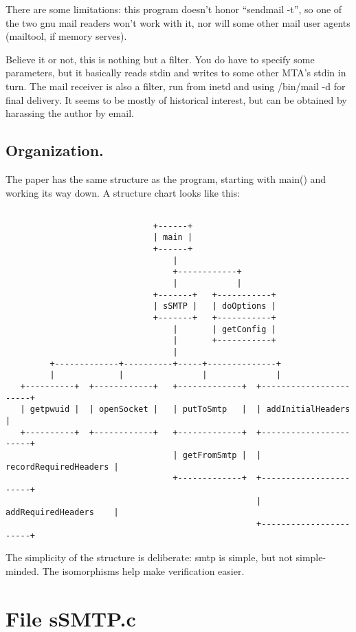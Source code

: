     There are some limitations: this program doesn't honor ``sendmail -t'',
so one of the two gnu mail readers won't work with it, nor will some
other mail user agents (mailtool, if memory serves).

    Believe it or not, this is nothing but a filter.  You do have to specify
some parameters, but it basically reads stdin and writes to some other
MTA's stdin in turn.
    The mail receiver is also a filter, run from inetd and using /bin/mail
-d for final delivery.  It seems to be mostly of historical interest, but
can be obtained by harassing the author by email.

\subsection{Organization.}
  The paper has the same structure as the program, starting with main()
and working its way down.
  A structure chart looks like this: 
\begin{verbatim}

                              +------+
                              | main |
                              +------+
                                  |
                                  +------------+
                                  |            |
                              +-------+   +-----------+
                              | sSMTP |   | doOptions |
                              +-------+   +-----------+
                                  |       | getConfig |
                                  |       +-----------+
                                  |
         +-------------+----------+-----+--------------+
         |             |                |              |
   +----------+  +------------+   +-------------+  +-----------------------+
   | getpwuid |  | openSocket |   | putToSmtp   |  | addInitialHeaders     |
   +----------+  +------------+   +-------------+  +-----------------------+
                                  | getFromSmtp |  | recordRequiredHeaders |
                                  +-------------+  +-----------------------+
                                                   | addRequiredHeaders    |
                                                   +-----------------------+
\end{verbatim}
  The simplicity of the structure is deliberate: smtp is simple, but
not simple-minded.  The isomorphisms help make verification easier.

\section{File sSMTP.c}

